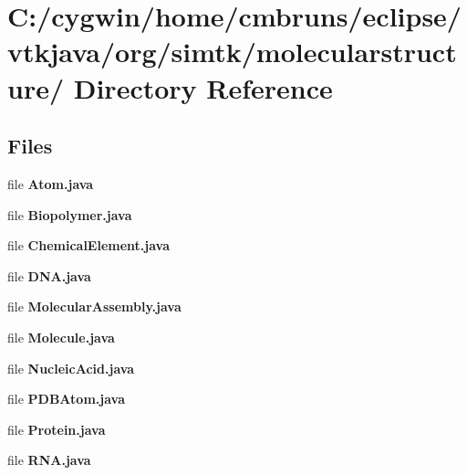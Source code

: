 \section{C:/cygwin/home/cmbruns/eclipse/vtkjava/org/simtk/molecularstructure/ Directory Reference}
\label{dir_000007}
\subsection*{Files}
\begin{CompactItemize}
\item 
file {\bf Atom.java}
\item 
file {\bf Biopolymer.java}
\item 
file {\bf Chemical\-Element.java}
\item 
file {\bf DNA.java}
\item 
file {\bf Molecular\-Assembly.java}
\item 
file {\bf Molecule.java}
\item 
file {\bf Nucleic\-Acid.java}
\item 
file {\bf PDBAtom.java}
\item 
file {\bf Protein.java}
\item 
file {\bf RNA.java}
\end{CompactItemize}
